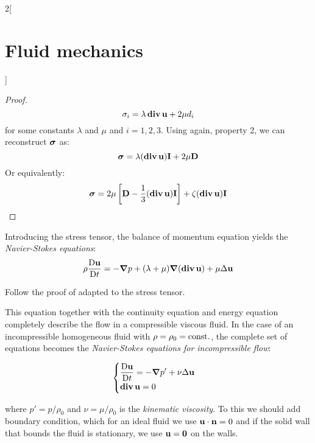 \documentclass[../../../main_physics.tex]{subfiles}
\begin{document}
\begin{multicols}{2}[\section{Fluid mechanics}]
\begin{proof}
    $$
      \sigma_i=\lambda \operatorname{\boldsymbol{\mathrm{div}}} \boldsymbol{\mathrm{u}} + 2\mu d_i
    $$
    for some constants $\lambda$ and $\mu$ and $i=1,2,3$. Using again, property 2, we can reconstruct $\boldsymbol{\mathrm{\sigma}}$ as:
    $$
      \boldsymbol{\mathrm{\sigma}}=\lambda (\operatorname{\boldsymbol{\mathrm{div}}} \boldsymbol{\mathrm{u}}) \boldsymbol{\mathrm{I}} + 2\mu \boldsymbol{\mathrm{D}}
    $$
    Or equivalently:
    $$
      \boldsymbol{\mathrm{\sigma}}=2\mu\left[\boldsymbol{\mathrm{D}} -\frac{1}{3}(\operatorname{\boldsymbol{\mathrm{div}}}\boldsymbol{\mathrm{u}}) \boldsymbol{\mathrm{I}}\right]+\zeta(\operatorname{\boldsymbol{\mathrm{div}}}\boldsymbol{\mathrm{u}}) \boldsymbol{\mathrm{I}}
    $$
  \end{proof}
  \begin{corollary}
    Introducing the stress tensor, the balance of momentum equation yields the \emph{Navier-Stokes equations}:
    $$
      \rho \frac{\mathrm{D}\boldsymbol{\mathrm{u}}}{\mathrm{D}t}=-\grad p + (\lambda+\mu)\grad(\operatorname{\boldsymbol{\mathrm{div}}}\boldsymbol{\mathrm{u}}) + \mu\Delta\boldsymbol{\mathrm{u}}
    $$
  \end{corollary}
  \begin{sproof}
    Follow the proof of  adapted to the stress tensor.
  \end{sproof}
  \begin{remark}
    This equation together with the continuity equation and energy equation completely describe the flow in a compressible viscous fluid. In the case of an incompressible homogeneous fluid with $\rho=\rho_0=\text{const.}$,  the
    complete set of equations becomes the \emph{Navier-Stokes equations for incompressible flow}:
    \begin{important}
      $$
        \begin{cases}
          \displaystyle\frac{\mathrm{D}\boldsymbol{\mathrm{u}}}{\mathrm{D}t}=-\grad p' + \nu\Delta\boldsymbol{\mathrm{u}} \\
          \displaystyle\operatorname{\boldsymbol{\mathrm{div}}}\boldsymbol{\mathrm{u}}=0
        \end{cases}
      $$
    \end{important}
    where $p'=p/\rho_0$ and $\nu=\mu/\rho_0$ is the \emph{kinematic viscosity}. To this we should add boundary condition, which for an ideal fluid we use $\boldsymbol{\mathrm{u}}\cdot \boldsymbol{\mathrm{n}}=0$ and if the solid wall that bounds the fluid is stationary, we use $\boldsymbol{\mathrm{u}}=\boldsymbol{\mathrm{0}}$ on the walls.
  \end{remark}

\end{multicols}
\end{document}
